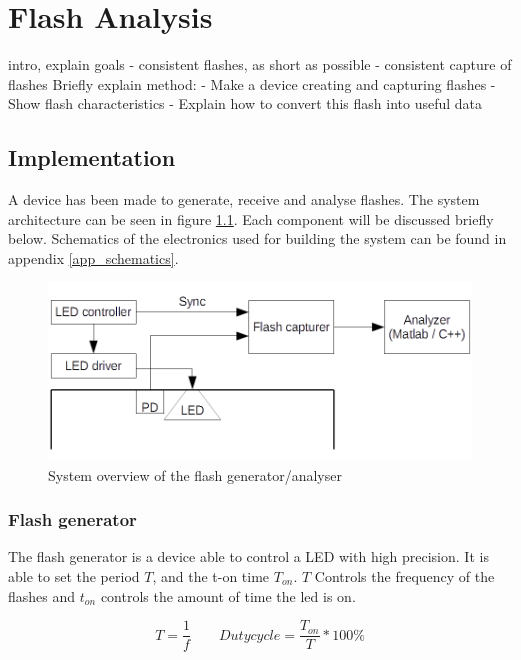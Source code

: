 \chapter{Flash Analysis}
\label{chp:Flash_Analysis}
intro, explain goals
	- consistent flashes, as short as possible
	- consistent capture of flashes
Briefly explain method:
	- Make a device creating and capturing flashes
	- Show flash characteristics
	- Explain how to convert this flash into useful data

\section{Implementation}
\label{sec:Implementation}
A device has been made to generate, receive and analyse flashes. The system architecture can be seen in figure \ref{fig:systemOveriew}. Each component will be discussed briefly below. Schematics of the electronics used for building the system can be found in appendix \ref{app_schematics}.

\begin{figure}[!h]
	\includegraphics[width=\textwidth]{pics/systemOverview.png}
	\caption{System overview of the flash generator/analyser}
	\label{fig:systemOveriew}
\end{figure}

\subsection{Flash generator}
The flash generator is a device able to control a LED with high precision. It is able to set the period $T$, and the t-on time $T_{on}$. $T$ Controls the frequency of the flashes and $t_{on}$ controls the amount of time the led is on.

\begin{equation}
\label{eq:1/f=T}
T=\frac{1}{f}
\qquad
Duty cycle=\frac{T_{on}}{T} * 100\%
\end{equation}

